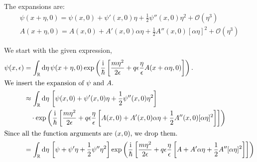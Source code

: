 \documentclass[11pt, english, fleqn, DIV=15, headinclude, BCOR=1.5cm]{scrartcl}
\begin{document}
The expansions are:
\begin{gather*}
    \psi(x + \eta, 0) = \psi(x, 0) + \psi'(x, 0) \eta + \frac 12 \psi''(x, 0)
    \eta^2 + \mathcal O(\eta^3) \\
    A(x + \eta, 0) = A(x, 0) + A'(x, 0) \alpha \eta + \frac 12 A''(x, 0)
    [\alpha\eta]^2 + \mathcal O(\eta^3)
\end{gather*}

We start with the given expression,
\begin{align*}
    \psi(x, \epsilon)
    &= \int_\R \dif \eta \, \psi(x + \eta, 0) \exp\del{
        \frac\iup\hbar \sbr{\frac{m \eta^2}{2\epsilon} + q \epsilon
        \frac\eta\epsilon A(x + \alpha \eta, 0)}
    }. \\
    \intertext{%
        We insert the expansion of $\psi$ and $A$.
    }
    &\approx \int_\R \dif \eta \, \sbr{\psi(x, 0) + \psi'(x, 0) \eta + \frac 12 \psi''(x, 0) \eta^2} \\
    &\quad\cdot\exp\del{ \frac\iup\hbar \sbr{\frac{m \eta^2}{2\epsilon} + q \epsilon \frac\eta\epsilon \sbr{A(x, 0) + A'(x, 0) \alpha \eta + \frac 12 A''(x, 0) [\alpha\eta]^2}} } \\
    \intertext{%
        Since all the function arguments are $(x, 0)$, we drop them.
    }
    &= \int_\R \dif \eta \, \sbr{\psi + \psi' \eta + \frac 12 \psi'' \eta^2} \exp\del{ \frac\iup\hbar \sbr{\frac{m \eta^2}{2\epsilon} + q \epsilon \frac\eta\epsilon \sbr{A + A' \alpha \eta + \frac 12 A'' [\alpha\eta]^2}} }
\end{align*}
\end{document}
